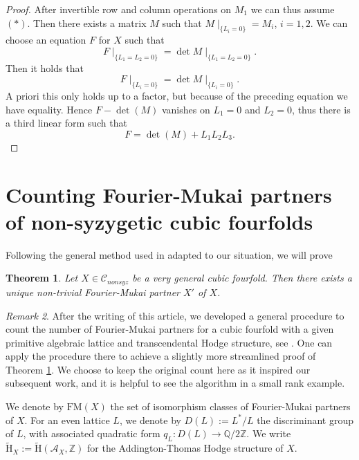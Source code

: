 \documentclass[11pt]{amsart}
\theoremstyle{plain}
\newtheorem{theorem}{Theorem}[section]
\numberwithin{equation}{section}
\theoremstyle{definition}
\theoremstyle{remark}
\newtheorem{remark}[theorem]{Remark}
\newcommand{\bQ}{\mathbb{Q}}
\newcommand{\bZ}{\mathbb{Z}}
\newcommand{\calA}{\mathcal{A}}
\newcommand{\calC}{\mathcal{C}}
\newcommand{\tH}{\widetilde{\mathrm{H}}}
\begin{document}
\begin{proof}
\medskip

After invertible row and column operations on $M_1$ we can thus assume $(\ast)$. Then there exists a matrix $M$ such that $M\mid_{\{L_i=0\}}=M_i$, $i=1, 2$. We can choose an equation $F$ for $X$ such that 
\[
F\mid_{\{L_1=L_2=0\}} = \det M\mid_{\{L_1=L_2=0\}} .
\]
 Then it holds that 
 \[
 F\mid_{\{L_i =0\}}= \det M\mid_{\{ L_i=0\}}.
 \]
 A priori this only holds up to a factor, but because of the preceding equation we have equality. Hence $F- \det (M)$ vanishes on $L_1=0$ and $L_2=0$, thus there is a third linear form such that
 \[
F = \det (M) + L_1L_2L_3 .
\]
 \end{proof}

\section{Counting Fourier-Mukai partners of non-syzygetic cubic fourfolds}\label{sCounting}

Following the general method used in \cite{FanLaiCremona} adapted to our situation, we will prove
\begin{theorem}\label{tFMPartners}
    Let $X\in \calC_{nonsyz}$ be a very general cubic fourfold. Then there exists a unique non-trivial Fourier-Mukai partner $X'$ of $X$. 
\end{theorem}

\begin{remark}
    After the writing of this article, we developed a general procedure to count the number of Fourier-Mukai partners for a cubic fourfold with a given primitive algebraic lattice and transcendental Hodge structure, see \cite{BGvBM25}. One can apply the procedure there to achieve a slightly more streamlined proof of Theorem \ref{tFMPartners}. We choose to keep the original count here as it inspired our subsequent work, and it is helpful to see the algorithm in a small rank example.
\end{remark}

We denote by $\mathrm{FM}(X)$ the set of isomorphism classes of Fourier-Mukai partners of $X$.  For an even lattice $L$, we denote by $D(L):=L^\ast/L$ the discriminant group of $L$, with associated quadratic form $q_L:D(L)\rightarrow \bQ/2\bZ.$ We write $\tH_X:= \tH(\calA_X,\bZ)$ for the Addington-Thomas Hodge structure of $X$.
\end{document}
